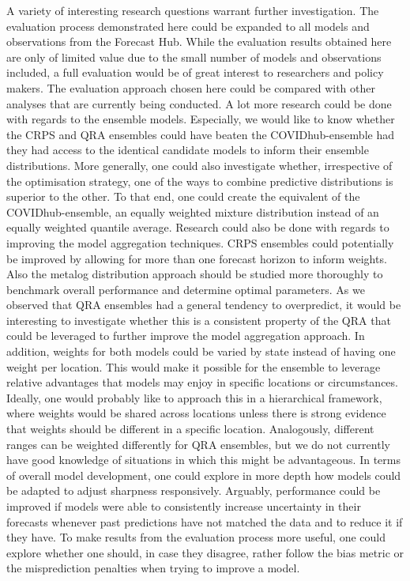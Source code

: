 \documentclass[
]{book}
\begin{document}
A variety of interesting research questions warrant further investigation. The evaluation process demonstrated here could be expanded to all models and observations from the Forecast Hub. While the evaluation results obtained here are only of limited value due to the small number of models and observations included, a full evaluation would be of great interest to researchers and policy makers. The evaluation approach chosen here could be compared with other analyses that are currently being conducted.
A lot more research could be done with regards to the ensemble models. Especially, we would like to know whether the CRPS and QRA ensembles could have beaten the COVIDhub-ensemble had they had access to the identical candidate models to inform their ensemble distributions. More generally, one could also investigate whether, irrespective of the optimisation strategy, one of the ways to combine predictive distributions is superior to the other. To that end, one could create the equivalent of the COVIDhub-ensemble, an equally weighted mixture distribution instead of an equally weighted quantile average. Research could also be done with regards to improving the model aggregation techniques. CRPS ensembles could potentially be improved by allowing for more than one forecast horizon to inform weights. Also the metalog distribution approach should be studied more thoroughly to benchmark overall performance and determine optimal parameters. As we observed that QRA ensembles had a general tendency to overpredict, it would be interesting to investigate whether this is a consistent property of the QRA that could be leveraged to further improve the model aggregation approach. In addition, weights for both models could be varied by state instead of having one weight per location. This would make it possible for the ensemble to leverage relative advantages that models may enjoy in specific locations or circumstances. Ideally, one would probably like to approach this in a hierarchical framework, where weights would be shared across locations unless there is strong evidence that weights should be different in a specific location. Analogously, different ranges can be weighted differently for QRA ensembles, but we do not currently have good knowledge of situations in which this might be advantageous. In terms of overall model development, one could explore in more depth how models could be adapted to adjust sharpness responsively. Arguably, performance could be improved if models were able to consistently increase uncertainty in their forecasts whenever past predictions have not matched the data and to reduce it if they have. To make results from the evaluation process more useful, one could explore whether one should, in case they disagree, rather follow the bias metric or the misprediction penalties when trying to improve a model.
\end{document}
